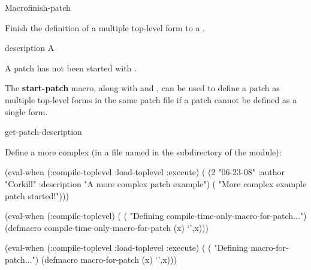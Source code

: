 \documentclass[10pt,twoside,english,pdftex]{article}
\begin{document}
\begin{functiondoc}{Macro}{finish-patch}{\superstar}
%
%

\fnsyntax 

\fnpurpose Finish the definition of a multiple top-level form  to
a .

\fnpackage {}

\fnmodule {}

\fnargs
\begin{args}{description}
\arg[form] A 
\end{args}

\fnerrors
A patch has not been started with \textbf{}.

\fndescription 
%
The \textbf{start-patch} macro, along with \textbf{}
and \textbf{}, can be used to define a patch as multiple
top-level forms in the same patch file if a patch cannot be defined as a
single \textbf{} form.

\begin{alsos}{get-patch-description}
\also[patch]
\also[undefmethod]
\end{alsos}

\fnexample 
%
Define a more complex  (in a file named 
in the  subdirectory of the module):
%
%
%
%
%
\W\supp
\begin{example}
  (eval-when (:compile-toplevel :load-toplevel :execute)
    ( (2 "06-23-08" 
                    :author "Corkill"
                    :description "A more complex patch example")
        ( "More complex example patch started!")))

  (eval-when (:compile-toplevel)
    (
     ( "Defining compile-time-only-macro-for-patch...")
     (defmacro compile-time-only-macro-for-patch (x)
       `',x)))

  (eval-when (:compile-toplevel :load-toplevel :execute)
    (
     ( "Defining macro-for-patch...")
     (defmacro macro-for-patch (x)
       `',x)))\goodpagebreak


\end{example}
\end{functiondoc}
\end{document}
